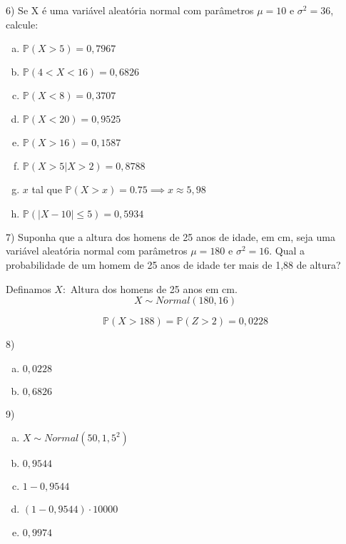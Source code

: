 \documentclass{article}
\begin{document}
\begin{enumerate}[a)]
\vspace{5px}

6) Se X é uma variável aleatória normal com parâmetros $\mu=10$ e $\sigma^2=36$, calcule:

\begin{enumerate}[a)]
    \item $\mathds{P}(X>5) = 0,7967$
    \item $\mathds{P}(4<X<16) = 0,6826$
    \item $\mathds{P}(X<8) = 0,3707$
    \item $\mathds{P}(X<20) = 0,9525$
    \item $\mathds{P}(X>16) = 0,1587$
    \item $\mathds{P}(X>5 | X> 2) = 0,8788$
    \item $x$ tal que $\mathds{P}(X>x) = 0.75 \implies x \approx 5,98$
    \item $\mathds{P}(|X-10| \leq 5) = 0,5934$
\end{enumerate}

\vspace{5px}

7)  Suponha que a altura dos homens de 25 anos de idade, em cm, seja uma variável aleatória normal com parâmetros $\mu = 180$ e $\sigma^2=16$. 
Qual a probabilidade de um homem de 25 anos de idade ter mais de 1,88 de altura?

Definamos $X:$ Altura dos homens de 25 anos em cm. 
$$X \sim Normal(180, 16)$$

$$\mathds{P}(X > 188) = \mathds{P}(Z > 2) = 0,0228$$

\vspace{5px}

8) 
\begin{enumerate}[a)]
    \item $0,0228$
    \item $0,6826$
\end{enumerate}
\vspace{5px}

9) 

\begin{enumerate}[a)]
    \item $X \sim Normal(50, 1,5^2)$
    \item $0,9544$
    \item  $1-0,9544$
    \item $(1-0,9544) \cdot 10000$
    \item $0,9974$
\end{enumerate}

\vspace{5px}



\end{enumerate}
\end{document}

